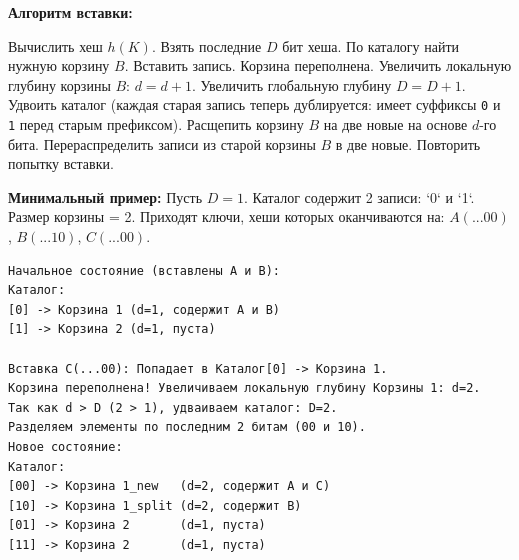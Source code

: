 \documentclass[12pt, a4paper]{article}
\begin{document}
\textbf{Алгоритм вставки:}
\begin{algorithmic}[1]
\STATE Вычислить хеш $h(K)$. Взять последние $D$ бит хеша.
\STATE По каталогу найти нужную корзину $B$.
    \STATE Вставить запись.
\ELSE
    \STATE Корзина переполнена. Увеличить локальную глубину корзины $B$: $d = d + 1$.
        \STATE Увеличить глобальную глубину $D = D + 1$. Удвоить каталог (каждая старая запись теперь дублируется: имеет суффиксы \texttt{0} и \texttt{1} перед старым префиксом).
    \ENDIF
    \STATE Расщепить корзину $B$ на две новые на основе $d$-го бита.
    \STATE Перераспределить записи из старой корзины $B$ в две новые.
    \STATE Повторить попытку вставки.
\ENDIF
\end{algorithmic}

\textbf{Минимальный пример:}
Пусть $D=1$. Каталог содержит 2 записи: `0` и `1`. Размер корзины = 2.
Приходят ключи, хеши которых оканчиваются на: $A(...00)$, $B(...10)$, $C(...00)$.
\begin{verbatim}
Начальное состояние (вставлены A и B):
Каталог:
[0] -> Корзина 1 (d=1, содержит A и B)
[1] -> Корзина 2 (d=1, пуста)

Вставка C(...00): Попадает в Каталог[0] -> Корзина 1.
Корзина переполнена! Увеличиваем локальную глубину Корзины 1: d=2.
Так как d > D (2 > 1), удваиваем каталог: D=2.
Разделяем элементы по последним 2 битам (00 и 10).
Новое состояние:
Каталог:
[00] -> Корзина 1_new   (d=2, содержит A и C)
[10] -> Корзина 1_split (d=2, содержит B)
[01] -> Корзина 2       (d=1, пуста)
[11] -> Корзина 2       (d=1, пуста)
\end{verbatim}
\end{document}

